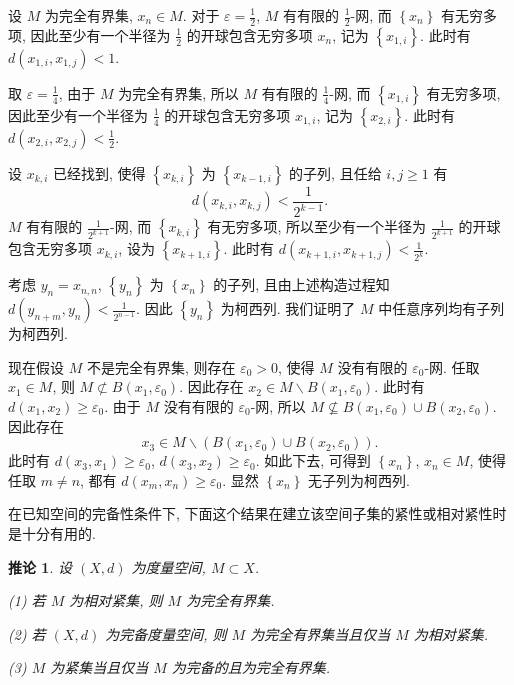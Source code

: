 \documentclass[openany]{ctexbook}
\makeatletter
\theoremstyle{kaiti}
\newtheorem{corollary}{推论}[section]
\theoremstyle{normal}
\renewenvironment{proof}[1][\proofname]{\par
    \pushQED{\qed}%
    \normalfont \topsep6\p@\@plus6\p@\relax
    \trivlist
    \item\relax
    {\heiti #1}\hspace{2\labelsep}\ignorespaces
  }{%
    \popQED\endtrivlist\@endpefalse
  }
\makeatother
\begin{document}
\begin{proof}
设 $M$ 为完全有界集, $x_n \in M$. 对于 $\varepsilon=\frac{1}{2}$, $M$ 有有限的 $\frac{1}{2}$-网, 而 $\left\{x_n\right\}$ 有无穷多项, 因此至少有一个半径为 $\frac{1}{2}$ 的开球包含无穷多项 $x_n$, 记为 $\left\{x_{1, i}\right\}$. 此时有 $d\left(x_{1, i}, x_{1, j}\right)<1$. 

取 $\varepsilon=\frac{1}{4}$, 由于 $M$ 为完全有界集, 所以 $M$ 有有限的 $\frac{1}{4}$-网, 而 $\left\{x_{1, i}\right\}$ 有无穷多项, 因此至少有一个半径为 $\frac{1}{4}$ 的开球包含无穷多项 $x_{1, i}$, 记为 $\left\{x_{2, i}\right\}$. 此时有 $d\left(x_{2, i}, x_{2, j}\right)<\frac{1}{2}$. 

设 $x_{k, i}$ 已经找到, 使得 $\left\{x_{k, i}\right\}$ 为 $\left\{x_{k-1, i}\right\}$ 的子列, 且任给 $i, j \geqslant 1$ 有
$$
d\left(x_{k, i}, x_{k, j}\right)<\frac{1}{2^{k-1}}.
$$
$M$ 有有限的 $\frac{1}{2^{k+1}}$-网, 而 $\left\{x_{k, i}\right\}$ 有无穷多项, 所以至少有一个半径为 $\frac{1}{2^{k+1}}$ 的开球包含无穷多项 $x_{k, i}$, 设为 $\left\{x_{k+1, i}\right\}$. 此时有 $d\left(x_{k+1, i}, x_{k+1, j}\right)<\frac{1}{2^{k}}$.

考虑 $y_n=x_{n, n}$, $\left\{y_n\right\}$ 为 $\left\{x_n\right\}$ 的子列, 且由上述构造过程知 $d\left(y_{n+m}, y_n\right)<\frac{1}{2^{n-1}}$. 因此 $\left\{y_n\right\}$ 为柯西列. 我们证明了 $M$ 中任意序列均有子列为柯西列.

现在假设 $M$ 不是完全有界集, 则存在 $\varepsilon_0>0$, 使得 $M$ 没有有限的 $\varepsilon_0$-网. 任取 $x_1 \in M$, 则 $M \not\subset B\left(x_1, \varepsilon_0\right)$. 因此存在 $x_2 \in M \backslash B\left(x_1, \varepsilon_0\right)$. 此时有 $d\left(x_1, x_2\right) \geqslant \varepsilon_0$. 由于 $M$ 没有有限的 $\varepsilon_0$-网, 所以 $M \nsubseteq B\left(x_1, \varepsilon_0\right) \cup B\left(x_2, \varepsilon_0\right)$. 因此存在
$$
x_3 \in M \backslash\left(B\left(x_1, \varepsilon_0\right) \cup B\left(x_2, \varepsilon_0\right)\right).
$$
此时有 $d\left(x_3, x_1\right) \geqslant \varepsilon_0$, $d\left(x_3, x_2\right) \geqslant \varepsilon_0$. 如此下去, 可得到 $\left\{x_n\right\}$, $x_n \in M$, 使得任取 $m \neq n$, 都有 $d\left(x_m, x_n\right) \geqslant \varepsilon_0$. 显然 $\left\{x_n\right\}$ 无子列为柯西列.
\end{proof}

在已知空间的完备性条件下, 下面这个结果在建立该空间子集的紧性或相对紧性时是十分有用的.

\begin{corollary}
设 $(X, d)$ 为度量空间, $M \subset X$.

(1) 若 $M$ 为相对紧集, 则 $M$ 为完全有界集.

(2) 若 $(X, d)$ 为完备度量空间, 则 $M$ 为完全有界集当且仅当 $M$ 为相对紧集.

(3) $M$ 为紧集当且仅当 $M$ 为完备的且为完全有界集.
\end{corollary}
\end{document}
